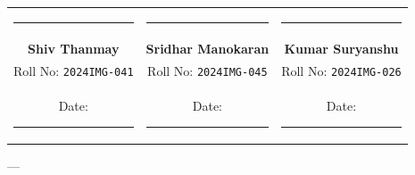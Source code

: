 \documentclass[11pt,a4paper]{article}
\begin{document}
\vspace{2.5em}

\noindent
\begin{tabular*}{\textwidth}{@{\extracolsep{\fill}}ccc@{}}
\rule{4.5cm}{0.4pt} & \rule{4.5cm}{0.4pt} & \rule{4.5cm}{0.4pt} \\
\textbf{Shiv Thanmay} & \textbf{Sridhar Manokaran} & \textbf{Kumar Suryanshu} \\
Roll No: \texttt{2024IMG-041} & Roll No: \texttt{2024IMG-045} & Roll No: \texttt{2024IMG-026} \\[0.5em]
Date: \rule{3.5cm}{0.4pt} & Date: \rule{3.5cm}{0.4pt} & Date: \rule{3.5cm}{0.4pt}
\end{tabular*}

\vspace{2em}

---
\end{document}
